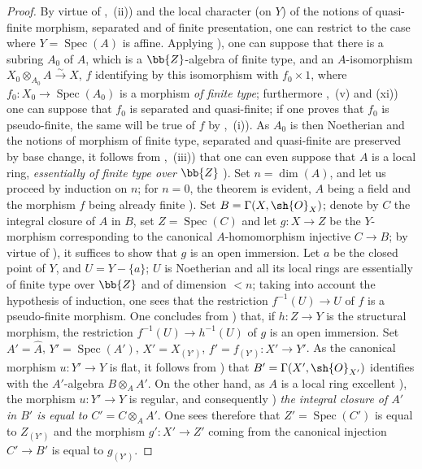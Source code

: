 \begin{proof}
By virtue of ,~(ii)) and the local character (on $Y$) of the notions of quasi-finite morphism, separated and of finite presentation, one can restrict to the case where $Y=\operatorname{Spec}(A)$ is affine.
Applying ), one can suppose that there is a subring $A_0$ of $A$, which is a $\bb{Z}$-algebra of finite type, and an $A$-isomorphism $X_0\otimes_{A_0}A\xrightarrow{\sim}X$, $f$ identifying by this isomorphism with $f_0\times 1$, where $f_0:X_0\to\operatorname{Spec}(A_0)$ is a morphism \emph{of finite type}; furthermore ,~(v) and (xi)) one can suppose that $f_0$ is separated and quasi-finite; if one proves that $f_0$ is pseudo-finite, the same will be true of $f$ by ,~(i)).
As $A_0$ is then Noetherian and the notions of morphism of finite type, separated and quasi-finite are preserved by base change, it follows from ,~(iii)) that one can even suppose that $A$ is a local ring, \emph{essentially of finite type over} $\bb{Z}$ ).
Set $n=\dim(A)$, and let us proceed by induction on $n$; for $n=0$, the theorem is evident, $A$ being a field and the morphism $f$ being already finite ).
Set $B=\Gamma(X,\sh{O}_X)$; denote by $C$ the integral closure of $A$ in $B$, set $Z=\operatorname{Spec}(C)$ and let $g:X\to Z$ be the $Y$-morphism corresponding to the canonical $A$-homomorphism injective $C\to B$; by virtue of ), it suffices to show that $g$ is an open immersion.
Let $a$ be the closed point of $Y$, and $U=Y-\{a\}$; $U$ is Noetherian and all its local rings are essentially of finite type over $\bb{Z}$ and of dimension $<n$; taking into account the hypothesis of induction, one sees that the restriction $f^{-1}(U)\to U$ of $f$ is a pseudo-finite morphism.
One concludes from ) that, if $h:Z\to Y$ is the structural morphism, the restriction $f^{-1}(U)\to h^{-1}(U)$ of $g$ is an open immersion.
Set $A'=\hat{A}$, $Y'=\operatorname{Spec}(A')$, $X'=X_{(Y')}$, $f'=f_{(Y')}:X'\to Y'$.
As the canonical morphism $u:Y'\to Y$ is flat, it follows from ) that $B'=\Gamma(X',\sh{O}_{X'})$ identifies with the $A'$-algebra $B\otimes_A A'$.
On the other hand, as $A$ is a local ring excellent ), the morphism $u:Y'\to Y$ is regular, and consequently ) \emph{the integral closure of $A'$ in $B'$ is equal to} $C'=C\otimes_A A'$.
One sees therefore that $Z'=\operatorname{Spec}(C')$ is equal to $Z_{(Y')}$ and the morphism $g':X'\to Z'$ coming from the canonical injection $C'\to B'$ is equal to $g_{(Y')}$.

\end{proof}
